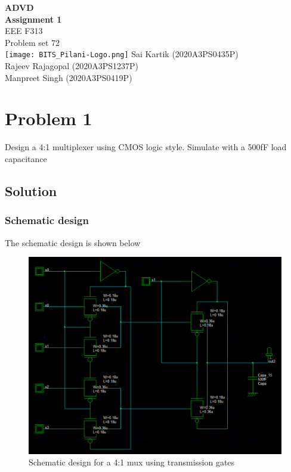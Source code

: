 \documentclass[titlepage]{article}
\begin{document}
\begin{titlepage}
    \begin{center}
        \Huge
        \vspace*{3cm}
        \textbf{  ADVD \\  \quad Assignment 1} \\
        \quad EEE F313\\[3ex]
        \huge
        \quad Problem set 72 \\[2ex]
        \quad\texttt{[image: BITS\_Pilani-Logo.png]}
        \vfill
        \huge
        \quad Sai Kartik (2020A3PS0435P)\\\quad Rajeev Rajagopal (2020A3PS1237P) \\ \quad Manpreet Singh (2020A3PS0419P)
    \end{center}
\end{titlepage}



\tableofcontents
\listoffigures
\newpage
{}
\setcounter{page}{1}

\section {Problem 1}

\begin{tcolorbox}
    Design a 4:1 multiplexer using CMOS logic style. Simulate with a 500fF load capacitance
\end{tcolorbox}

\subsection{Solution}

\subsubsection{Schematic design}
The schematic design is shown below
\begin{figure}[ht]
    \centering
    \includegraphics[scale = 0.5]{muxsch.png}
    \caption{Schematic design for a 4:1 mux using transmission gates}
    \label{fig1}
\end{figure}
\newpage
\end{document}
